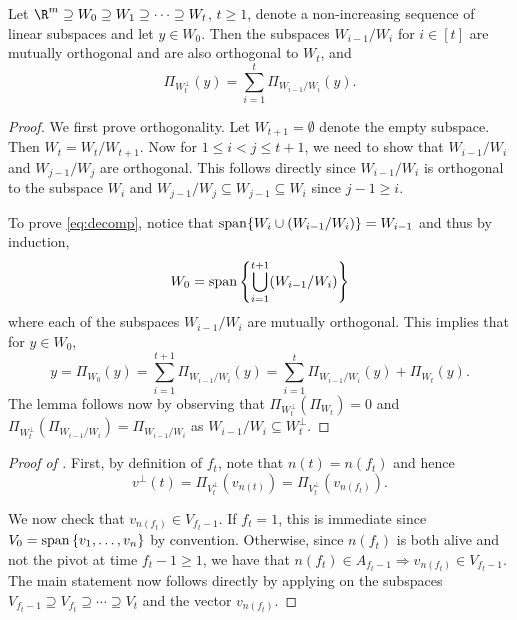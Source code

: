 \documentclass{toc}
\newcommand{\set}[1]{\left\{ #1 \right\}}
\begin{document}
\begin{lemma}
\label{lem:decomp}
Let $\R^m \supseteq W_0 \supseteq W_1 \supseteq \cdots \supseteq W_t $, $t \geq
1$, denote a non-increasing sequence of linear subspaces and let $y \in W_0$.
Then the subspaces $W_{i-1}/W_i$ for $i\in [t]$ are mutually orthogonal and are also orthogonal to $W_t$, and
\begin{equation}
\label{eq:decomp}
\Pi_{W_t^\perp}(y) = \sum_{i=1}^t \Pi_{W_{i-1} / W_i}(y).
\end{equation}
\end{lemma}
\begin{proof}
We first prove orthogonality. Let $W_{t+1}=\emptyset$ denote the empty subspace. Then $W_t = W_t / W_{t+1}$. Now for $1 \leq i < j \leq t+1$, we need to show that
$W_{i-1}/W_i$ and $W_{j-1}/W_j$ are orthogonal. This follows
directly since $W_{i-1}/W_i$ is orthogonal to the subspace $W_i$ and
$W_{j-1}/W_j \subseteq W_{j-1} \subseteq W_i$ since $j-1 \geq i$.

To prove \eqref{eq:decomp}, notice that ${\rm span}\{W_i\cup (W_{i-1}/ W_i)\} =W_{i-1}$ and thus by induction,
\[W_0={\rm span} \left\{ \bigcup_{i=1}^{t+1} (W_{i-1}/ W_i )\right\} \]
where each of the subspaces $W_{i-1}/ W_i$ are mutually orthogonal. This implies that for $y\in W_0$,
\[ y =\Pi_{W_0}(y)= \sum_{i=1}^{t+1} \Pi_{W_{i-1} / W_i}(y)  = \sum_{i=1}^{t} \Pi_{W_{i-1} / W_i}(y) +  \Pi_{W_{t}}(y).\]
The lemma follows now by observing that $\Pi_{W_t^{\perp}} ( \Pi_{W_{t}}) =0 $ and $\Pi_{W_t^{\perp}}(  \Pi_{W_{i-1} / W_i}  )  = \Pi_{W_{i-1} / W_i}$ as $W_{i-1} / W_i \subseteq W_t^{\perp}$.
\end{proof}

\begin{proof}[Proof of ]
First, by definition of $f_t$, note that $n(t) = n(f_t)$ and hence
\[
v^\perp(t) = \Pi_{V_t^\perp}(v_{n(t)}) = \Pi_{V_t^\perp}(v_{n(f_t)}).
\]

We now check that $v_{n(f_t)} \in V_{f_t-1}$. If $f_t = 1$, this is immediate
since $V_0 = {\rm span}\set{v_1,\ldots,v_n}$ by convention. Otherwise, since $n(f_t)$ is both alive and
not the pivot at time $f_t-1 \geq 1$, we have that $n(f_t) \in A_{f_t-1}
\Rightarrow v_{n(f_t)} \in V_{f_t-1}$. The main statement now follows directly by
applying  on the subspaces $V_{f_t-1} \supseteq V_{f_t}
\supseteq \cdots \supseteq V_t$ and the vector $v_{n(f_t)}$.
\end{proof}
\end{document}
